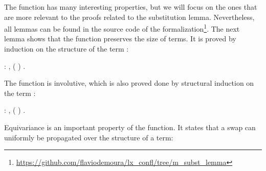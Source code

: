 The  function has many interesting properties, but we will focus on the ones that are more relevant to the proofs related to the substitution lemma. Nevertheless, all lemmas can be found in the source code of the formalization\footnote{\url{https://github.com/flaviodemoura/lx_confl/tree/m_subst_lemma}}. The next lemma shows that the  function preserves the size of terms. It is proved by induction on the structure of the term : 
\begin{coqdoccode}
\coqdocemptyline
\coqdocnoindent
{}  : \coqdockw{\ensuremath{\forall}}   ,  (   )   .\coqdoceol
\coqdocemptyline
\coqdocemptyline
\end{coqdoccode}
The  function is involutive, which is also proved done by structural induction on the term : 
\begin{coqdoccode}
\coqdocemptyline
\coqdocnoindent
{}  : \coqdockw{\ensuremath{\forall}}   ,\coqdoceol
\coqdocindent{2.00em}
   (   )  .\coqdoceol
\coqdocemptyline
\coqdocemptyline
\end{coqdoccode}
Equivariance is an important property of the  function. It states that a swap can uniformly be propagated over the structure of a term:

